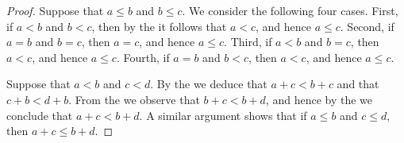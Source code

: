 \begin{proof}
	\hfill

	Suppose that $a \leq b$ and $b \leq c$. We consider the following four cases. First, if $a < b$ and $b < c$, then by the  it follows that $a < c$, and hence $a \leq c$. Second, if $a = b$ and $b = c$, then $a = c$, and hence $a \leq c$. Third, if $a < b$ and $b = c$, then $a < c$, and hence $a \leq c$. Fourth, if $a = b$ and $b < c$, then $a < c$, and hence $a \leq c$.

	Suppose that $a < b$ and $c < d$. By the  we deduce that $a + c < b + c$ and that $c + b < d + b$. From the  we observe that $b + c < b + d$, and hence by the  we conclude that $a + c < b + d$. A similar argument shows that if $a \leq b$ and $c \leq d$, then $a + c \leq b + d$.


\end{proof}
